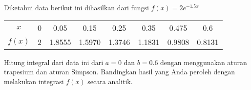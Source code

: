\begin{soal}[Chapra 21.13]
Diketahui data berikut ini dihasilkan dari fungsi $f(x)=2e^{-1.5x}$
    
{\centering
\begin{tabular}{|c|ccccccc|}
\hline
$x$    & 0 & 0.05   & 0.15 & 0.25 & 0.35 & 0.475 & 0.6 \\
$f(x)$ & 2 & 1.8555 & 1.5970 & 1.3746 & 1.1831 & 0.9808 & 0.8131 \\
\hline
\end{tabular}
\par}
    
Hitung integral dari data ini dari $a=0$ dan $b=0.6$ dengan menggunakan
aturan trapesium dan aturan Simpson. Bandingkan hasil yang Anda peroleh
dengan melakukan integrasi $f(x)$ secara analitik.
\end{soal}